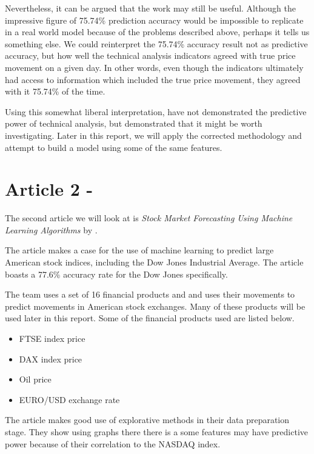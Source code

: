 \documentclass{report}
\begin{document}
Nevertheless, it can be argued that the work may still be useful. Although the impressive figure of 75.74\% prediction accuracy would be impossible to replicate in a real world model because of the problems described above, perhaps it tells us something else. We could reinterpret the 75.74\% accuracy result not as predictive accuracy, but how well the technical analysis indicators agreed with true price movement on a given day. In other words, even though the indicators ultimately had access to information which included the true price movement, they agreed with it 75.74\% of the time. 

Using this somewhat liberal interpretation, \citet{kara2011predicting} have not demonstrated the predictive power of technical analysis, but demonstrated that it might be worth investigating. Later in this report, we will apply the corrected methodology and attempt to build a model using some of the same features.

\section{Article 2 - \citet{shen2012stock}}

The second article we will look at is \textit{Stock Market Forecasting Using Machine Learning Algorithms} by \citet{shen2012stock}.

The article makes a case for the use of machine learning to predict large American stock indices, including the Dow Jones Industrial Average. The article boasts a 77.6\% accuracy rate for the Dow Jones specifically. 

The team uses a set of 16 financial products and and uses their movements to predict movements in American stock exchanges. Many of these products will be used later in this report. Some of the financial products used are listed below.

\begin{itemize}[noitemsep]
  \item FTSE index price
  \item DAX index price
  \item Oil price
  \item EURO/USD exchange rate
\end{itemize}

The article makes good use of explorative methods in their data preparation stage. They show using graphs there there is a some features may have predictive power because of their correlation to the NASDAQ index. 
\end{document}
